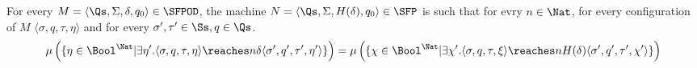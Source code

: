 \begin{lemma}
  \label{lemma:SFPODtoSFP}
  For every $M = \langle \Qs, \Sigma, \delta, q_0\rangle
  \in \SFPOD$, the machine $N = \langle \Qs, \Sigma, H(\delta), q_0\rangle
  \in \SFP$ is such that for evry $n \in \Nat$,
  for every configuration of $M$ $\langle \sigma, q, \tau, \eta\rangle$ and for
  every $\sigma', \tau' \in \Ss, q \in \Qs$.
  $$
  \mu \left(\{\eta \in \Bool^\Nat| \exists \eta'. \langle \sigma, q, \tau, \eta\rangle\reaches n \delta \langle \sigma', q', \tau', \eta'\rangle\}\right)
  =
  \mu \left(\{\chi \in \Bool^\Nat|  \exists \chi'. \langle \sigma, q, \tau, \xi\rangle\reaches n {H(\delta)} \langle \sigma', q', \tau', \chi'\rangle\}\right)
  $$
\end{lemma}
